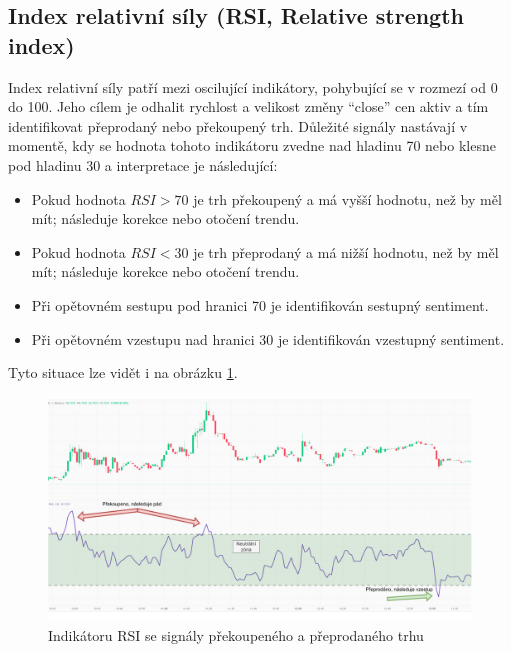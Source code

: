 \subsection{Index relativní síly (RSI, Relative strength index)}
Index relativní síly patří mezi oscilující indikátory, pohybující se v rozmezí od 0 do 100. Jeho cílem je odhalit rychlost a velikost změny \enquote{close} cen aktiv a tím identifikovat
přeprodaný nebo překoupený trh. Důležité signály nastávají v momentě, kdy se hodnota tohoto indikátoru zvedne nad hladinu 70 nebo klesne pod hladinu 30 a interpretace je následující:
\begin{itemize}
    \item Pokud hodnota $RSI > 70$ je trh překoupený a má vyšší hodnotu, než by měl mít; následuje korekce nebo otočení trendu.
    \item Pokud hodnota $RSI < 30$ je trh přeprodaný a má nižší hodnotu, než by měl mít; následuje korekce nebo otočení trendu.
    \item Při opětovném sestupu pod hranici 70 je identifikován sestupný sentiment.
    \item Při opětovném vzestupu nad hranici 30 je identifikován vzestupný sentiment.
\end{itemize}
Tyto situace lze vidět i na obrázku \ref{fig:rsi}.

\begin{figure}[h]
    \centering
    \includegraphics[width=1\textwidth]{Figures/RSI.pdf}
    \caption{Indikátoru RSI se signály překoupeného a přeprodaného trhu}
    \label{fig:rsi}
\end{figure}

